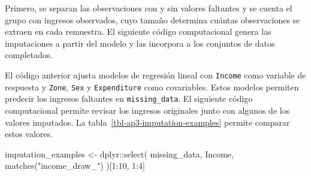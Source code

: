 \documentclass[
  spanish,
  11pt,
  letterpaper,
  oneside,
  open=any]{scrbook}
\newenvironment{Shaded}{\begin{snugshade}}{\end{snugshade}}
\newcommand{\AttributeTok}[1]{\textcolor[rgb]{0.40,0.45,0.13}{#1}}
\newcommand{\ConstantTok}[1]{\textcolor[rgb]{0.56,0.35,0.01}{#1}}
\newcommand{\ControlFlowTok}[1]{\textcolor[rgb]{0.00,0.23,0.31}{\textbf{#1}}}
\newcommand{\DecValTok}[1]{\textcolor[rgb]{0.68,0.00,0.00}{#1}}
\newcommand{\FunctionTok}[1]{\textcolor[rgb]{0.28,0.35,0.67}{#1}}
\newcommand{\NormalTok}[1]{\textcolor[rgb]{0.00,0.23,0.31}{#1}}
\newcommand{\OtherTok}[1]{\textcolor[rgb]{0.00,0.23,0.31}{#1}}
\newcommand{\SpecialCharTok}[1]{\textcolor[rgb]{0.37,0.37,0.37}{#1}}
\newcommand{\StringTok}[1]{\textcolor[rgb]{0.13,0.47,0.30}{#1}}
\begin{document}
Primero, se separan las observaciones con y sin valores faltantes y se
cuenta el grupo con ingresos observados, cuyo tamaño determina cuántas
observaciones se extraen en cada remuestra. El siguiente código
computacional genera las imputaciones a partir del modelo y las
incorpora a los conjuntos de datos completados.

\begin{Shaded}
\end{Shaded}

El código anterior ajusta modelos de regresión lineal con
\texttt{Income} como variable de respuesta y \texttt{Zone}, \texttt{Sex}
y \texttt{Expenditure} como covariables. Estos modelos permiten predecir
los ingresos faltantes en \texttt{missing\_data}. El siguiente código
computacional permite revisar los ingresos originales junto con algunos
de los valores imputados. La tabla~\ref{tbl-ap3-imputation-examples}
permite comparar estos valores.

\begin{Shaded}
\begin{Highlighting}[]
\NormalTok{imputation\_examples }\OtherTok{\textless{}{-}}\NormalTok{ dplyr}\SpecialCharTok{::}\FunctionTok{select}\NormalTok{(}
\NormalTok{  missing\_data,}
\NormalTok{  Income,}
  \FunctionTok{matches}\NormalTok{(}\StringTok{"income\_draw\_"}\NormalTok{)}
\NormalTok{)[}\DecValTok{1}\SpecialCharTok{:}\DecValTok{10}\NormalTok{, }\DecValTok{1}\SpecialCharTok{:}\DecValTok{4}\NormalTok{]}
\end{Highlighting}
\end{Shaded}
\end{document}
